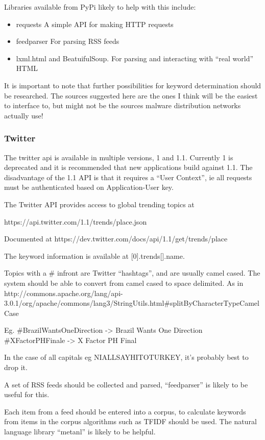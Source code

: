 Libraries available from PyPi likely to help with this include:

\begin{itemize}
    \item requests A simple API for making HTTP requests
    \item feedparser For parsing RSS feeds
    \item lxml.html and BeatuifulSoup. For parsing and interacting with ``real world'' HTML
\end{itemize}

It is important to note that further possibilities for keyword determination should be researched. The sources suggested here are the ones I think will be the easiest to interface to, but might not be the sources malware distribution networks actually use!

\subsubsection{Twitter}
The twitter api is available in multiple versions, 1 and 1.1. Currently 1 is deprecated and it is recommended that new applications build against 1.1.  The disadvantage of the 1.1 API is that it requires a ``User Context'', ie all requests must be authenticated based on Application-User key.

The Twitter API provides access to global trending topics at     

https://api.twitter.com/1.1/trends/place.json

Documented at https://dev.twitter.com/docs/api/1.1/get/trends/place

The keyword information is available at [0].trends[].name.

Topics with a # infront are Twitter ``hashtags'', and are usually camel cased. The system should be able to convert from camel cased to space delimited. As in http://commons.apache.org/lang/api-3.0.1/org/apache/commons/lang3/StringUtils.html#splitByCharacterTypeCamelCase%

Eg. #BrazilWantsOneDirection -> Brazil Wants One Direction
#XFactorPHFinale -> X Factor PH Final

In the case of all capitals eg NIALLSAYHITOTURKEY, it's probably best to drop it.

A set of RSS feeds should be collected and parsed, ``feedparser'' is likely to be useful for this.

Each item from a feed should be entered into a corpus, to calculate keywords from items in the corpus algorithms such as TFIDF should be used. The natural language library ``metanl'' is likely to be helpful.

